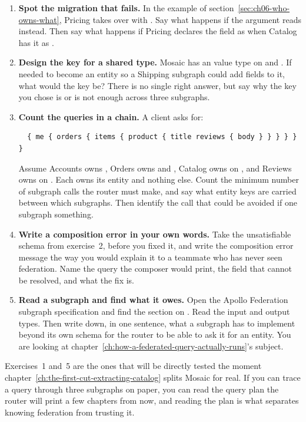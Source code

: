 \begin{enumerate}
  Name the specific thing the composer rejects and why. Then write the
   declaration that fixes it.

  \item \textbf{Spot the migration that fails.} In the  example
  of section~\ref{sec:ch06-who-owns-what}, Pricing takes over  with
  . Say what happens if the 
  argument reads  instead. Then say what happens if Pricing
  declares the field as  when Catalog has it as .

  \item \textbf{Design the key for a shared type.} Mosaic has an
   value type on  and . If
   needed to become an entity so a Shipping subgraph could add
  fields to it, what would the key be? There is no single right answer, but say
  why the key you chose is or is not enough across three subgraphs.

  \item \textbf{Count the queries in a chain.} A client asks for:

  \begin{verbatim}
  { me { orders { items { product { title reviews { body } } } } } }
  \end{verbatim}

  Assume Accounts owns , Orders owns  and
  , Catalog owns  on , and
  Reviews owns  on . Each owns its entity and nothing else. Count the minimum
  number of subgraph calls the router must make, and say what entity keys are
  carried between which subgraphs. Then identify the call that could be avoided
  if one subgraph  something.

  \item \textbf{Write a composition error in your own words.} Take the
  unsatisfiable schema from exercise~2, before you fixed it, and write the
  composition error message the way you would explain it to a teammate who has
  never seen federation. Name the query the composer would print, the field that
  cannot be resolved, and what the fix is.

  \item \textbf{Read a subgraph and find what it owes.} Open the Apollo
  Federation subgraph specification and find the section on
  . Read the input and output types. Then write down, in
  one sentence, what a subgraph has to implement beyond its own schema for the
  router to be able to ask it for an entity. You are looking at
  chapter~\ref{ch:how-a-federated-query-actually-runs}'s subject.
\end{enumerate}

Exercises~1 and~5 are the ones that will be directly tested the moment
chapter~\ref{ch:the-first-cut-extracting-catalog} splits Mosaic for real. If you
can trace a query through three subgraphs on paper, you can read the query plan
the router will print a few chapters from now, and reading the plan is what
separates knowing federation from trusting it.
